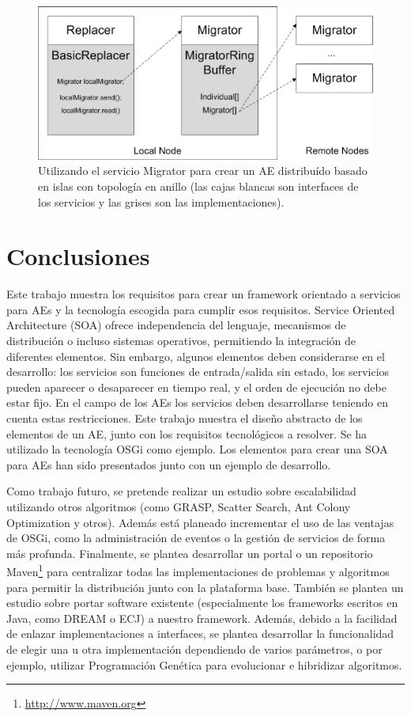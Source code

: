 \documentclass[runningheads]{llncs}
\begin{document}
\begin{figure}[ht] 
\begin{center} 
\includegraphics[scale=0.6]{images/migrator.eps}
\end{center} 
\caption{Utilizando el servicio Migrator para crear un AE distribuído basado en islas con topología en anillo (las cajas blancas son interfaces de los servicios y las grises son las implementaciones).} 
\label{MIGRATOR} 
\end{figure} 

\section{Conclusiones}
\label{sec:conclusions}
Este trabajo muestra los requisitos para crear un framework orientado a servicios para AEs y la tecnología escogida para cumplir esos requisitos.  Service Oriented Architecture (SOA) ofrece independencia del lenguaje, mecanismos de distribución o incluso sistemas operativos, permitiendo la integración de diferentes elementos. Sin embargo, algunos elementos deben considerarse en el desarrollo: los servicios son funciones de entrada/salida sin estado, los servicios pueden aparecer o desaparecer en tiempo real, y el orden de ejecución no debe estar fijo. En el campo de los AEs los servicios deben desarrollarse teniendo en cuenta estas restricciones. Este trabajo muestra el diseño abstracto de los elementos de un AE, junto con los requisitos tecnológicos a resolver. Se ha utilizado la tecnología OSGi como ejemplo. Los elementos para crear una SOA para AEs han sido presentados junto con un ejemplo de desarrollo.

Como trabajo futuro, se pretende realizar un estudio sobre escalabilidad utilizando otros algoritmos (como GRASP, Scatter Search, Ant Colony Optimization y otros). Además está planeado incrementar el uso de las ventajas de OSGi, como la administración de eventos o la gestión de servicios de forma más profunda. Finalmente, se plantea desarrollar un portal o un repositorio Maven\footnote{\url{http://www.maven.org}} para centralizar todas las implementaciones de problemas y algoritmos para permitir la distribución junto con la plataforma base. También se plantea un estudio sobre portar software existente (especialmente los frameworks escritos en Java, como DREAM o ECJ) a nuestro framework. Además, debido a la facilidad de enlazar implementaciones a interfaces, se plantea desarrollar la funcionalidad de elegir una u otra implementación dependiendo de varios parámetros, o por ejemplo, utilizar Programación Genética para evolucionar e hibridizar algoritmos.
\end{document}
